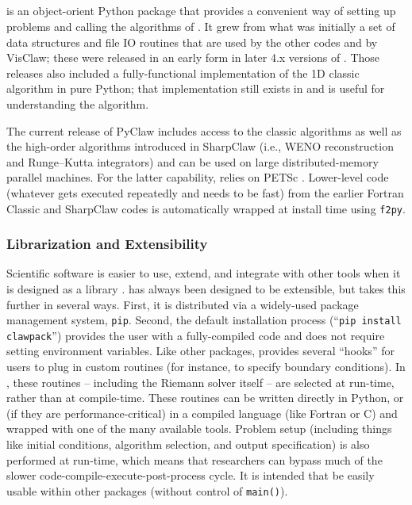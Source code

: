 %
%
%

\subsection{\pyclaw} \label{sec:pyclaw}
\pyclaw is an object-orient Python package that provides a convenient way
of setting up problems and calling the algorithms of \clawpack.  It grew
from what was initially a set of data structures and file IO routines that are
used by the other \clawpack codes and by VisClaw; these were released in
an early form in later 4.x versions of \clawpack.  Those releases also
included a fully-functional implementation of the 1D classic algorithm
in pure Python; that implementation still exists in \pyclaw and is useful
for understanding the algorithm.

The current release of PyClaw includes access to the classic algorithms as well
as the high-order algorithms introduced in SharpClaw \cite{2013_sharpclaw} (i.e., WENO
reconstruction and Runge--Kutta integrators) and can be used on large
distributed-memory parallel machines.  For the latter capability, \pyclaw
relies on PETSc \cite{petsc-user-ref}.
Lower-level code (whatever gets executed
repeatedly and needs to be fast) from the earlier Fortran Classic and SharpClaw
codes is automatically wrapped at install time using \texttt{f2py}.

\subsubsection{Librarization and Extensibility}
Scientific software is easier to use, extend, and integrate with other tools
when it is designed as a library \cite{Brown:2015cj}.  \clawpack has always been
designed to be extensible, but \pyclaw takes this further in several ways.
First, it is distributed via a widely-used package management system,
\texttt{pip}. Second, the default installation process (``\texttt{pip install
clawpack}'') provides the user with a fully-compiled code and does not require
setting environment variables.  Like other \clawpack packages, \pyclaw provides
several ``hooks'' for users to plug in custom routines (for instance, to specify
boundary conditions). In \pyclaw, these routines -- including the Riemann solver
itself -- are selected at run-time, rather than at compile-time.  These routines
can be written directly in Python, or (if they are performance-critical) in a
compiled language (like Fortran or C) and wrapped with one of the many available
tools.  Problem setup (including things like initial conditions, algorithm
selection, and output specification) is also performed at run-time, which means
that researchers can bypass much of the slower code-compile-execute-post-process
cycle. It is intended that \pyclaw be easily usable within other packages
(without control of \texttt{main()}).  

